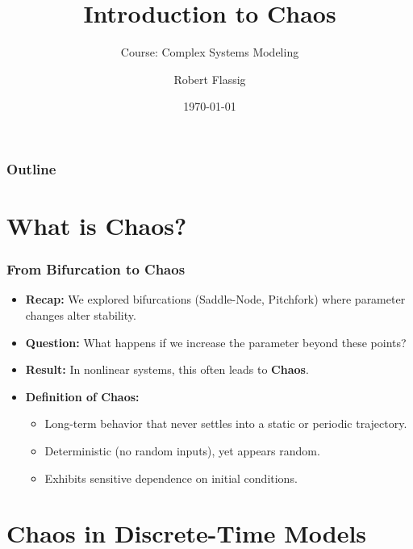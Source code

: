 \documentclass{beamer}
\title{Introduction to Chaos}
\subtitle{Course: Complex Systems Modeling}
\author{Robert Flassig}
\institute{Brandenburg University of Applied Sciences}
\date{\today}
\begin{document}
\begin{frame}
    \titlepage
\end{frame}

\begin{frame}
    \frametitle{Outline}
    \tableofcontents
\end{frame}

\section{What is Chaos?}

\begin{frame}
    \frametitle{From Bifurcation to Chaos}
    \begin{itemize}
        \item \textbf{Recap:} We explored bifurcations (Saddle-Node, Pitchfork) where parameter changes alter stability.
        \item \textbf{Question:} What happens if we increase the parameter beyond these points?
        \item \textbf{Result:} In nonlinear systems, this often leads to \textbf{Chaos}.
        \item \textbf{Definition of Chaos:}
        \begin{itemize}
            \item Long-term behavior that never settles into a static or periodic trajectory.
            \item Deterministic (no random inputs), yet appears random.
            \item Exhibits sensitive dependence on initial conditions.
        \end{itemize}
    \end{itemize}
\end{frame}

\section{Chaos in Discrete-Time Models}
\end{document}
